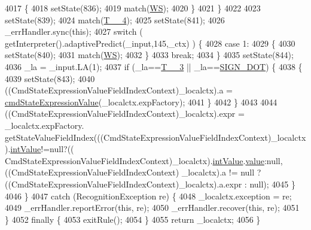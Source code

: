 \begin{DoxyCode}
4017         \{
4018         setState(836);
4019         match(\hyperlink{classgov_1_1nasa_1_1jpf_1_1inspector_1_1server_1_1expression_1_1parser_1_1_expression_grammar_parser_ace44714ae633c7b14794cc5a24d9ebf3}{WS});
4020         \}
4021       \}
4022 
4023       setState(839);
4024       match(\hyperlink{classgov_1_1nasa_1_1jpf_1_1inspector_1_1server_1_1expression_1_1parser_1_1_expression_grammar_parser_ae620c05745b7d42e86cfe3f8113e22d2}{T\_\_4});
4025       setState(841);
4026       \_errHandler.sync(\textcolor{keyword}{this});
4027       \textcolor{keywordflow}{switch} ( getInterpreter().adaptivePredict(\_input,145,\_ctx) ) \{
4028       \textcolor{keywordflow}{case} 1:
4029         \{
4030         setState(840);
4031         match(\hyperlink{classgov_1_1nasa_1_1jpf_1_1inspector_1_1server_1_1expression_1_1parser_1_1_expression_grammar_parser_ace44714ae633c7b14794cc5a24d9ebf3}{WS});
4032         \}
4033         \textcolor{keywordflow}{break};
4034       \}
4035       setState(844);
4036       \_la = \_input.LA(1);
4037       \textcolor{keywordflow}{if} (\_la==\hyperlink{classgov_1_1nasa_1_1jpf_1_1inspector_1_1server_1_1expression_1_1parser_1_1_expression_grammar_parser_a68f9589dcc3fc777455467ff010385ea}{T\_\_3} || \_la==\hyperlink{classgov_1_1nasa_1_1jpf_1_1inspector_1_1server_1_1expression_1_1parser_1_1_expression_grammar_parser_af578d1cac8553bcf6f52608a4e9125f1}{SIGN\_DOT}) \{
4038         \{
4039         setState(843);
4040         ((CmdStateExpressionValueFieldIndexContext)\_localctx).a = 
      \hyperlink{classgov_1_1nasa_1_1jpf_1_1inspector_1_1server_1_1expression_1_1parser_1_1_expression_grammar_parser_a9c38888905b31e514c2e4a695b8b2be6}{cmdStateExpressionValue}(\_localctx.expFactory);
4041         \}
4042       \}
4043 
4044        ((CmdStateExpressionValueFieldIndexContext)\_localctx).expr =  \_localctx.expFactory.
      getStateValueFieldIndex(((CmdStateExpressionValueFieldIndexContext)\_localctx).\hyperlink{classgov_1_1nasa_1_1jpf_1_1inspector_1_1server_1_1expression_1_1parser_1_1_expression_grammar_parser_a8c7e4b657a12e07efe3ea6429cb9cdcf}{intValue}!=null?((
      CmdStateExpressionValueFieldIndexContext)\_localctx).\hyperlink{classgov_1_1nasa_1_1jpf_1_1inspector_1_1server_1_1expression_1_1parser_1_1_expression_grammar_parser_a8c7e4b657a12e07efe3ea6429cb9cdcf}{intValue}.\hyperlink{classgov_1_1nasa_1_1jpf_1_1inspector_1_1server_1_1expression_1_1parser_1_1_expression_grammar_parser_1_1_int_value_context_a4c7175811f1802632486ad762d032ad5}{value}:null, ((CmdStateExpressionValueFieldIndexContext)
      \_localctx).a != null ? ((CmdStateExpressionValueFieldIndexContext)\_localctx).a.expr : null); 
4045       \}
4046     \}
4047     \textcolor{keywordflow}{catch} (RecognitionException re) \{
4048       \_localctx.exception = re;
4049       \_errHandler.reportError(\textcolor{keyword}{this}, re);
4050       \_errHandler.recover(\textcolor{keyword}{this}, re);
4051     \}
4052     \textcolor{keywordflow}{finally} \{
4053       exitRule();
4054     \}
4055     \textcolor{keywordflow}{return} \_localctx;
4056   \}
\end{DoxyCode}
